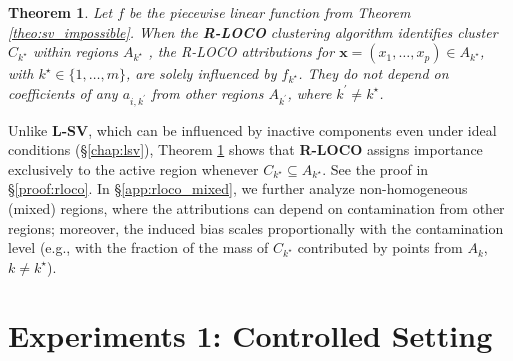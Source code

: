 \documentclass{article}
\newcommand\x{\boldsymbol{x}}
\theoremstyle{plain}
\newtheorem{theorem}{Theorem}[section]
\theoremstyle{definition}
\theoremstyle{remark}
\newcommand{\ours}{\textcolor{ours}{\textbf{R-LOCO}}}
\newcommand{\lsv}{\textcolor{lsv}{\textbf{L-SV}}}
\begin{document}
\begin{theorem} 
    Let $f$ be the piecewise linear function from Theorem \ref{theo:sv_impossible}. When the \ours{} clustering algorithm identifies cluster $C_{k^\star}$ within regions $A_{k^\star}$ , the R-LOCO attributions for $\x = (x_1, \dots, x_p) \in A_{k^\star}$, with $k^\star \in \{1, \dots, m\}$, are solely influenced by $f_{k^\star}$. They do not depend on coefficients of any $a_{i,k^\prime}$ from other regions $A_{k^\prime}$, where $k^\prime \neq k^\star$. \label{theo:rloco}
\end{theorem}

Unlike \lsv{}, which can be influenced by inactive components even under ideal conditions (\S\ref{chap:lsv}), Theorem \ref{theo:rloco} shows that \ours{} assigns importance exclusively to the active region whenever $C_{k^\star} \subseteq A_{k^\star}$. See the proof in \S\ref{proof:rloco}. In \S\ref{app:rloco_mixed}, we further analyze non-homogeneous (mixed) regions, where the attributions can depend on contamination from other regions; moreover, the induced bias scales proportionally with the contamination level (e.g., with the fraction of the mass of $C_{k^\star}$ contributed by points from $A_{k}$, $k \neq k^\star$).




\vspace{-0.4cm}
\section{Experiments 1: Controlled Setting}
\end{document}
